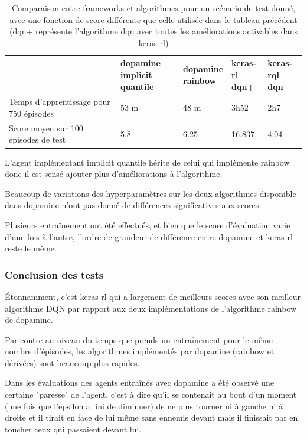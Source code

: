 \documentclass[a4paper,10pt,openany,oneside]{report}
\begin{document}
\begin{table}[H]
	\label{sec:table23}
	\centering
		
	\begin{tabular}{|l|l|l|l|l|}
		\hline
		                                         & \thead{dopamine\\implicit quantile} & \thead{dopamine\\rainbow} & \thead{keras-rl\\dqn+} & \thead{keras-rql\\dqn} \\ \hline
		Temps d'apprentissage pour 750 épisodes & 53 m            & 48 m & 3h52   & 2h7  \\ \hline
		Score moyen sur 100 épisodes de test    & 5.8             & 6.25 & 16.837 & 4.04 \\ \hline
	\end{tabular}
	\caption{Comparaison entre frameworks et algorithmes pour un scénario de test donné, avec une fonction de score différente que celle utilisée dans le tableau précédent (dqn+ représente l'algorithme dqn avec toutes les améliorations activables dans keras-rl)}
	
	
\end{table}

L'agent implémentant implicit quantile hérite de celui qui implémente rainbow donc il est sensé ajouter plus d'améliorations à l'algorithme.

Beaucoup de variations des hyperparamètres sur les deux algorithmes disponible dans dopamine n'ont pas donné de différences significatives aux scores.

Plusieurs entraînement ont été effectués, et bien que le score d'évaluation varie d'une fois à l'autre, l'ordre de grandeur de différence entre dopamine et keras-rl reste le même.

\subsubsection*{Conclusion des tests}
Étonnamment, c'est keras-rl qui a largement de meilleurs scores avec son meilleur algorithme DQN par rapport aux deux implémentations de l'algorithme rainbow de dopamine.

Par contre au niveau du temps que prends un entraînement pour le même nombre d'épisodes, les algorithmes implémentés par dopamine (rainbow et dérivées) sont beaucoup plus rapides.

Dans les évaluations des agents entraînés avec dopamine a été observé une certaine "paresse" de l'agent, c'est à dire qu'il se contenait au bout d'un moment (une fois que l'epsilon a fini de diminuer) de ne plus tourner ni à gauche ni à droite et il tirait en face de lui même sans ennemis devant mais il finissait par en toucher ceux qui passaient devant lui.
\end{document}

